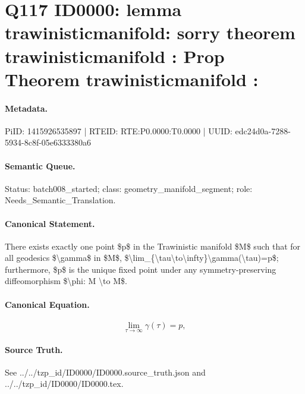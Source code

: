 \section*{Q117 ID0000: lemma trawinisticmanifold: sorry theorem trawinisticmanifold : Prop Theorem trawinisticmanifold :}
\paragraph{Metadata.}
PiID: 1415926535897 | RTEID: RTE:P0.0000:T0.0000 | UUID: edc24d0a-7288-5934-8c8f-05e6333380a6

\paragraph{Semantic Queue.}
Status: batch008\_started; class: geometry\_manifold\_segment; role: Needs\_Semantic\_Translation.

\paragraph{Canonical Statement.}
There exists exactly one point \$p\$ in the Trawinistic manifold \$M\$ such that for all geodesics \$\textbackslash{}gamma\$ in \$M\$, \$\textbackslash{}lim\_\{\textbackslash{}tau\textbackslash{}to\textbackslash{}infty\}\textbackslash{}gamma(\textbackslash{}tau)=p\$; furthermore, \$p\$ is the unique fixed point under any symmetry-preserving diffeomorphism \$\textbackslash{}phi: M \textbackslash{}to M\$.

\paragraph{Canonical Equation.}
\[
\lim_{\tau\to\infty}\gamma(\tau)=p,
\]

\paragraph{Source Truth.}
See ../../tzp\_id/ID0000/ID0000.source\_truth.json and ../../tzp\_id/ID0000/ID0000.tex.
